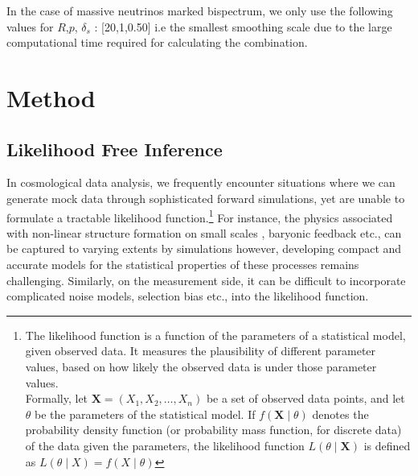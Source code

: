 In the case of massive neutrinos marked bispectrum, we only use the following values for $R$,$ p $, $ \delta_s $ : [20,1,0.50] i.e the smallest smoothing scale due to the large computational time required for calculating the combination.  



\section{Method}
\subsection{Likelihood Free Inference}
In cosmological data analysis, we frequently encounter situations where we can generate mock data through sophisticated forward simulations, yet are unable to formulate a tractable likelihood function.\footnote{The likelihood function is a function of the parameters of a statistical model, given observed data. It measures the plausibility of different parameter values, based on how likely the observed data is under those parameter values.\\
Formally, let $\mathbf{X} = (X_1, X_2, \ldots, X_n)$
be a set of observed data points, and let $\theta$ be the parameters of the statistical model. If $f(\mathbf{X} \mid \theta)$ denotes the probability density function (or probability mass function, for discrete data) of the data given the parameters, the likelihood function $L(\theta \mid \mathbf{X})$ is defined as $L(\theta \mid X) = f(X \mid \theta)$} 
For instance, the physics associated with non-linear structure formation on small scales \cite{Springel2005Natur.435..629S, QijoteVillaescusa_Navarro_2020, Klypin_2011}, baryonic feedback \cite{springel2018MNRAS.475..676S} etc., can be captured to varying extents by simulations however, developing compact and accurate models for the statistical properties of these processes remains challenging. Similarly, on the measurement side, it can be difficult to incorporate complicated noise models, selection bias etc., into the likelihood function.\\
